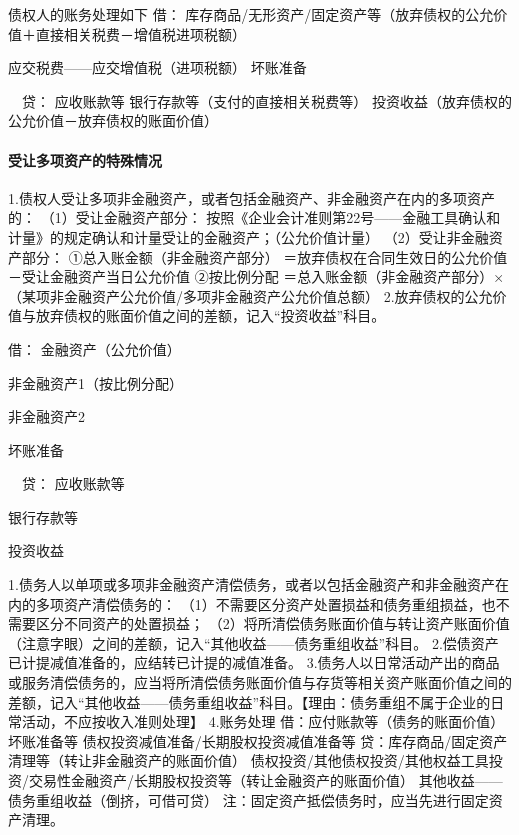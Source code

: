 \documentclass[UTF8,12pt]{ctexart}
\newenvironment{Dr}{\noindent 借：}{\par}
\newenvironment{Cr}{\noindent \ \ 贷：}{\par}
\numberwithin{equation}{section} %
\numberwithin{figure}{section}
\numberwithin{table}{section}
\begin{document}
	债权人的账务处理如下
	\begin{Dr}
		库存商品/无形资产/固定资产等（放弃债权的公允价值＋直接相关税费－增值税进项税额）
		
		应交税费——应交增值税（进项税额）
		坏账准备
		
	\end{Dr}
	\begin{Cr}
		应收账款等
		银行存款等（支付的直接相关税费等）
		投资收益（放弃债权的公允价值－放弃债权的账面价值）
		
	\end{Cr}
	
	\paragraph{受让多项资产的特殊情况}
	1.债权人受让多项非金融资产，或者包括金融资产、非金融资产在内的多项资产的：
	（1）受让金融资产部分：
	按照《企业会计准则第22号——金融工具确认和计量》的规定确认和计量受让的金融资产；（公允价值计量）
	（2）受让非金融资产部分：
	①总入账金额（非金融资产部分）
	＝放弃债权在合同生效日的公允价值－受让金融资产当日公允价值
	②按比例分配
	＝总入账金额（非金融资产部分）×（某项非金融资产公允价值/多项非金融资产公允价值总额）
	2.放弃债权的公允价值与放弃债权的账面价值之间的差额，记入“投资收益”科目。
	
	\begin{Dr}
		金融资产（公允价值）
		
		非金融资产1（按比例分配）
		
		非金融资产2
		
		坏账准备
	\end{Dr}
	\begin{Cr}
		应收账款等
		
		银行存款等
		
		投资收益
	\end{Cr}
	
	1.债务人以单项或多项非金融资产清偿债务，或者以包括金融资产和非金融资产在内的多项资产清偿债务的：
	（1）不需要区分资产处置损益和债务重组损益，也不需要区分不同资产的处置损益；
	（2）将所清偿债务账面价值与转让资产账面价值（注意字眼）之间的差额，记入“其他收益——债务重组收益”科目。
	2.偿债资产已计提减值准备的，应结转已计提的减值准备。
	3.债务人以日常活动产出的商品或服务清偿债务的，应当将所清偿债务账面价值与存货等相关资产账面价值之间的差额，记入“其他收益——债务重组收益”科目。【理由：债务重组不属于企业的日常活动，不应按收入准则处理】
	4.账务处理
	借：应付账款等（债务的账面价值）
	坏账准备等
	债权投资减值准备/长期股权投资减值准备等
	贷：库存商品/固定资产清理等（转让非金融资产的账面价值）
	债权投资/其他债权投资/其他权益工具投资/交易性金融资产/长期股权投资等（转让金融资产的账面价值）
	其他收益——债务重组收益（倒挤，可借可贷）
	注：固定资产抵偿债务时，应当先进行固定资产清理。
	
\end{document}
